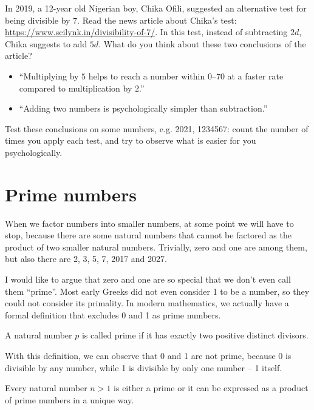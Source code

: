 \begin{exercise}
    In 2019, a 12-year old Nigerian boy, Chika Ofili, suggested an alternative test for being divisible by $7$.
    Read the news article about Chika's test: \url{https://www.scilynk.in/divisibility-of-7/}.
    In this test, instead of subtracting $2d$, Chika suggests to add $5d$. What do you think about these two conclusions of the article?
    \begin{itemize}
    \item ``Multiplying by $5$ helps to reach a number within $0$--$70$ at a faster rate compared to multiplication by $2$.''
    \item ``Adding two numbers is psychologically simpler than subtraction.''
    \end{itemize}
    Test these conclusions on some numbers, e.g. 2021, 1234567: count the number of times you apply each test, and try to observe what is easier for you psychologically.
\end{exercise}

\section{Prime numbers}

When we factor numbers into smaller numbers, at some point we will have to stop, because there are some natural numbers that cannot be factored as the product of two smaller natural numbers. Trivially, zero and one are among them, but also there are 2, 3, 5, 7, 2017 and 2027.

I would like to argue that zero and one are so special that we don't even call them ``prime''. Most early Greeks did not even consider 1 to be a number, so they could not consider its primality. In modern mathematics, we actually have a formal definition that excludes 0 and 1 as prime numbers.

\begin{definition}
    A natural number $p$ is called prime if it has exactly two positive distinct divisors.
\end{definition}

With this definition, we can observe that 0 and 1 are not prime, because 0 is divisible by any number, while 1 is divisible by only one number -- 1 itself.

\begin{theorem}
    Every natural number $n>1$ is either a prime or it can be expressed as a product of prime numbers in a unique way.
\end{theorem}


